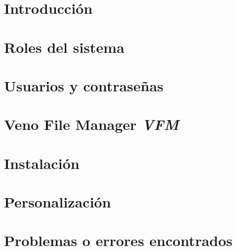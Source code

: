 \documentclass[letterpaper,11pt]{texMemo} %
\begin{document}
\vspace*{0.1in}
\section{Introducción}
 
\section{Roles del sistema}

\section{Usuarios y contraseñas}
%

\section{Veno File Manager \emph{VFM}}

\section{Instalación}
%

\section{Personalización}
%

\section{Problemas o errores encontrados}
%


%

%
\end{document}
